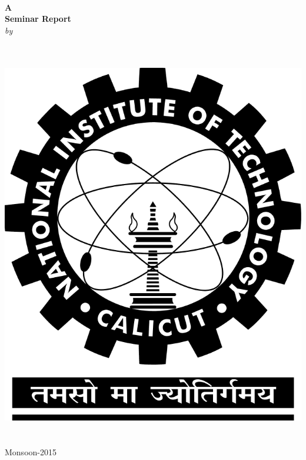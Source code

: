 \begin{titlepage}
\vspace*{0.7cm}
\centering

\large

{\Large \textbf{\myTopic{}}}\\[2cm]

\textbf{A\\
	Seminar Report}\\[0.35cm]

\textit{by}\\[0.5cm]

\textrm{\textbf{\myName{}\\
		\myRollNo{}}}\\[1cm]

\vfill

\includegraphics[scale=0.2]{./nitc-logo.png}\\[1cm]

\myDeptName{}\\
\myCollegeName{}\\[0.2cm]

{\Large Monsoon-2015}

\end{titlepage}
